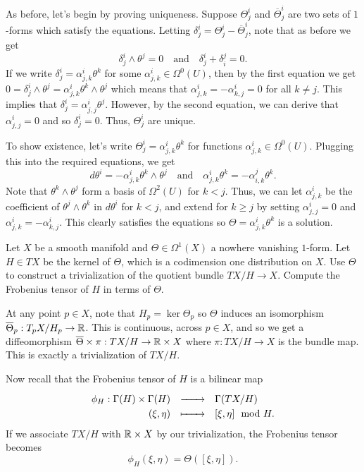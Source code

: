 \documentclass{../../templates/lkx_pset}
\begin{document}
\begin{parts}
	As before, let's begin by proving uniqueness. Suppose $\Theta^i_j$ and $\overline{\Theta}^i_j$ are two sets of $1$-forms which satisfy the equations. Letting $\delta^i_j = \Theta^i_j - \overline{\Theta}^i_j$, note that as before we get
	\[ \delta^i_j\wedge \theta^j = 0\quad\textrm{and}\quad \delta^i_j+\delta^j_i=0.\]
	If we write $\delta^i_j = \alpha_{j,k}^i\theta^k$ for some $\alpha^i_{j,k}\in \Omega^0(U)$, then by the first equation we get $0=\delta^i_j \wedge\theta^j = \alpha^i_{j,k}\theta^k\wedge \theta^j$ which means that $\alpha_{j,k}^i=-\alpha_{k,j}^i=0$ for all $k\neq j$. This implies that $\delta^i_j = \alpha^i_{j,j}\theta^j$. However, by the second equation, we can derive that $\alpha_{j,j}^i=0$ and so $\delta_j^i=0$. Thus, $\Theta^i_j$ are unique.

	\pagebreak
	To show existence, let's write $\Theta^i_j = \alpha^i_{j,k}\theta^k$ for functions $\alpha^i_{j,k}\in \Omega^0(U)$. Plugging this into the required equations, we get
	\[
		d\theta^i = -\alpha_{j,k}^i\theta^k \wedge \theta^j\quad\textrm{and}\quad
		\alpha^i_{j,k}\theta^k =
		-\alpha^j_{i,k}\theta^k.
	\]
	Note that $\theta^k\wedge \theta^j$ form a basis of $\Omega^2(U)$ for $k<j$. Thus, we can let $\alpha^i_{j,k}$ be the coefficient of $\theta^j\wedge \theta^k$ in $d\theta^i$ for $k<j$, and extend for $k\geq j$ by setting $\alpha^i_{j,j}=0$ and $\alpha^i_{j,k}=-\alpha^i_{k,j}$. This clearly satisfies the equations so $\Theta=\alpha_{j,k}^i\theta^k$ is a solution.
\end{parts}

\begin{problem}{2}
Let $X$ be a smooth manifold and $\Theta\in \Omega^1(X)$ a nowhere vanishing $1$-form. Let $H\in TX$ be the kernel of $\Theta$, which is a codimension one distribution on $X$. Use $\Theta$ to construct a trivialization of the quotient bundle $TX/H\to X$. Compute the Frobenius tensor of $H$ in terms of $\Theta$.
\end{problem}

At any point $p\in X$, note that $H_p = \ker \Theta_p$ so $\Theta$ induces an isomorphism $\overline{\Theta}_p : T_p X / H_p \to \mathbb{R}$. This is continuous, across $p\in X$, and so we get a diffeomorphism $\overline{\Theta}\times \pi : TX/H \to \mathbb{R}\times X$ where $\pi : TX/H \to X$ is the bundle map. This is exactly a trivialization of $TX/H$.

Now recall that the Frobenius tensor of $H$ is a bilinear map
\[
	\definefunction{\phi_H}{\Gamma(H)\times \Gamma(H)}{\Gamma(TX/H)}{(\xi, \eta)}{[\xi,\eta]\mod H.}
\]
If we associate $TX/H$ with $\mathbb{R}\times X$ by our trivialization, the Frobenius tensor becomes
\[
	\phi_H(\xi,\eta) = \Theta([\xi,\eta]).
\]
\end{document}
